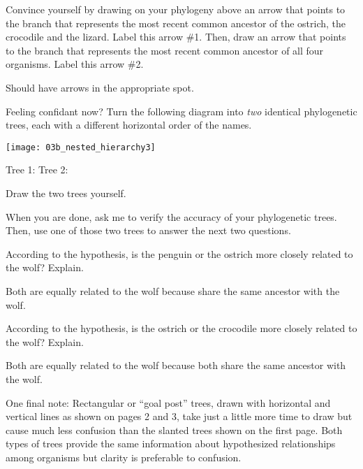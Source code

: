 \documentclass[12pt, hidelinks]{exam}
\newcommand*\AnswerBox[2]{%
    \parbox[t][#1]{0.92\textwidth}{%
    \begin{solution}#2\end{solution}}
}
\begin{document}
\begin{questions}
\setcounter{question}{7}

\question
Convince yourself by drawing on your phylogeny above an
arrow that points to the branch that represents the most recent common
ancestor of the ostrich, the crocodile and the lizard. Label this arrow
\#1. Then, draw an arrow that points to the branch that represents the
most recent common ancestor of all four organisms. Label this arrow \#2.

\AnswerBox{3\baselineskip}{Should have arrows in the appropriate spot.}

\question
Feeling confidant now? Turn the following diagram into
\emph{two} identical phylogenetic trees, each with a different
horizontal order of the names.

\end{questions}

\begin{center}
	\noindent\texttt{[image: 03b\_nested\_hierarchy3]}
\end{center}

Tree 1: \hspace*{0.4\textwidth}Tree 2:

\AnswerBox{3\baselineskip}{Draw the two trees yourself.}

\newpage

When you are done, ask me to verify the accuracy of your phylogenetic
trees. Then, use one of those two trees to answer the next two
questions.

\begin{questions}
\setcounter{question}{9}

\question
According to the hypothesis, is the penguin or the ostrich
more closely related to the wolf? Explain.

\AnswerBox{5\baselineskip}{Both are equally related to the wolf because 
share the same ancestor with the wolf.}

\question
According to the hypothesis, is the ostrich or the
crocodile more closely related to the wolf? Explain.

\AnswerBox{5\baselineskip}{Both are equally related to the wolf because
both share the same ancestor with the wolf.}

\end{questions}

One final note: Rectangular or “goal post” trees, drawn with horizontal and vertical
lines as shown on pages 2 and 3, take just a little more time to draw but
cause much less confusion than the slanted trees shown on the first page.
Both types of trees provide the same information about hypothesized
relationships among organisms but clarity is preferable to confusion.
\end{document}
